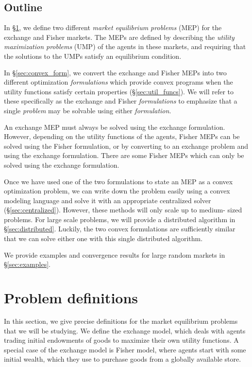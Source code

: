\documentclass[12pt]{article}
\begin{document}
\subsection{Outline}

In \S\ref{sec:defs}, we define two different \emph{market equilibrium problems}
(MEP) for the exchange and Fisher markets. The MEPs are defined by describing
the \emph{utility maximization problems} (UMP) of the agents in these markets,
and requiring that the solutions to the UMPs satisfy an equilibrium condition.

In \S\ref{sec:convex_form}, we convert the exchange and Fisher MEPs into two
different optimization \emph{formulations} which provide convex programs when
the utility functions satisfy certain properties (\S\ref{sec:util_funcs}). We
will refer to these specifically as the exchange and Fisher \emph{formulations}
to emphasize that a single \emph{problem} may be solvable using either
\emph{formulation}.

An exchange MEP must always be solved using the exchange formulation. However,
depending on the utility functions of the agents, Fisher MEPs can be solved
using the Fisher formulation, or by converting to an exchange problem and using
the exchange formulation. There are some Fisher MEPs which can only be solved
using the exchange formulation.

Once we have used one of the two formulations to state an MEP as a convex
optimization problem, we can write down the problem easily using a convex
modeling language and solve it with an appropriate centralized solver
(\S\ref{sec:centralized}). However, these methods will only scale up to medium-
sized problems. For large scale problems, we will provide a distributed
algorithm in \S\ref{sec:distributed}. Luckily, the two convex formulations are
sufficiently similar that we can solve either one with this single distributed
algorithm.

We provide examples and convergence results for large random markets in
\S\ref{sec:examples}.


\section{Problem definitions}
\label{sec:defs}

In this section, we give precise definitions for the market equilibrium
problems that we will be studying. We define the exchange model, which deals
with agents trading initial endowments of goods to maximize their own utility
functions. A special case of the exchange model is Fisher model, where agents
start with some initial wealth, which they use to purchase goods  from a
globally available store.
\end{document}
